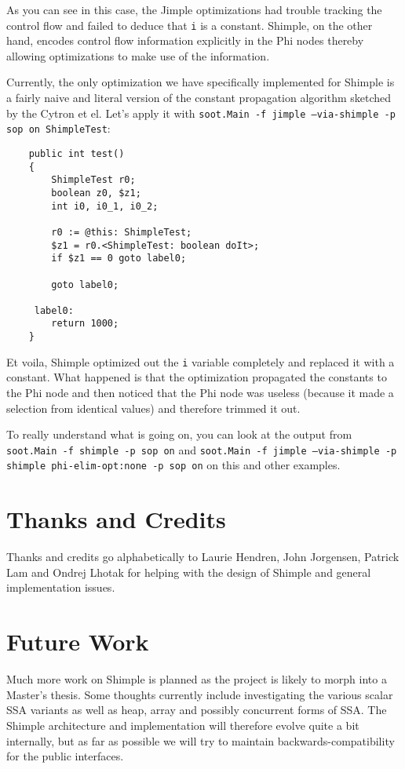 \documentclass[10pt,letterpaper,oneside,onecolumn]{article}
\begin{document}
As you can see in this case, the Jimple optimizations had trouble
tracking the control flow and failed to deduce that {\tt i} is a
constant.  Shimple, on the other hand, encodes control flow
information explicitly in the Phi nodes thereby allowing optimizations
to make use of the information.

Currently, the only optimization we have specifically implemented for
Shimple is a fairly naive and literal version of the constant
propagation algorithm sketched by the Cytron et el.  Let's apply it
with {\tt soot.Main -f jimple --via-shimple -p sop on ShimpleTest}:

\begin{verbatim}
    public int test()
    {
        ShimpleTest r0;
        boolean z0, $z1;
        int i0, i0_1, i0_2;

        r0 := @this: ShimpleTest;
        $z1 = r0.<ShimpleTest: boolean doIt>;
        if $z1 == 0 goto label0;

        goto label0;

     label0:
        return 1000;
    }
\end{verbatim}

Et voila, Shimple optimized out the {\tt i} variable completely and
replaced it with a constant.  What happened is that the optimization
propagated the constants to the Phi node and then noticed that the
Phi node was useless (because it made a selection from identical
values) and therefore trimmed it out.

To really understand what is going on, you can look at the output from
{\tt soot.Main -f shimple -p sop on} and {\tt soot.Main -f jimple
--via-shimple -p shimple phi-elim-opt:none -p sop on} on this and
other examples.

\section{Thanks and Credits}

Thanks and credits go alphabetically to Laurie Hendren, John
Jorgensen, Patrick Lam and Ondrej Lhotak for helping with the design
of Shimple and general implementation issues.

\section{Future Work}

Much more work on Shimple is planned as the project is likely to morph
into a Master's thesis.  Some thoughts currently include investigating
the various scalar SSA variants as well as heap, array and possibly
concurrent forms of SSA.  The Shimple architecture and implementation
will therefore evolve quite a bit internally, but as far as possible
we will try to maintain backwards-compatibility for the public
interfaces.
\end{document}
